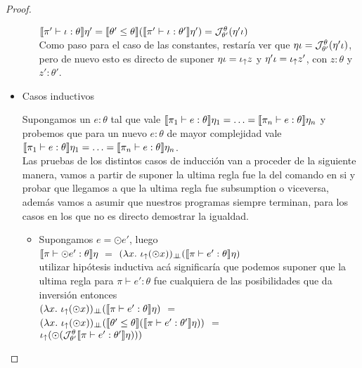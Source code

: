 \begin{proof}
\begin{itemize}
\begin{itemize}
$\llbracket \pi' \vdash \iota : \theta \rrbracket\eta' = 
\llbracket \theta' \leq \theta \rrbracket (\llbracket \pi' \vdash \iota : \theta' \rrbracket\eta') = 
\mathcal{J}_{\theta'}^{\theta} (\eta' \iota)$\\

Como paso para el caso de las constantes, restar\'ia ver que 
$\eta \iota = \mathcal{J}_{\theta'}^{\theta} (\eta' \iota)$, pero de nuevo esto es directo
de suponer $\eta \iota = \iota_{\uparrow} z$ y $\eta' \iota = \iota_{\uparrow} z'$, con
$z:\theta$ y $z':\theta'$.

\end{itemize}

\item Casos inductivos

Supongamos un $e : \theta$ tal que vale
$\llbracket \pi_1 \vdash e : \theta \rrbracket\eta_1 = \ldots = \llbracket \pi_n \vdash e : \theta \rrbracket\eta_n$ 
y probemos
que para un nuevo $e : \theta$ de mayor complejidad vale\\
$\llbracket \pi_1 \vdash e : \theta \rrbracket\eta_1 = \ldots = 
\llbracket \pi_n \vdash e : \theta \rrbracket\eta_n$. \\

Las pruebas de los distintos casos de inducci\'on van a proceder de la siguiente manera,
vamos a partir de suponer la ultima regla fue la del comando en si y probar que llegamos
a que la ultima regla fue subsumption o viceversa, adem\'as vamos a asumir que nuestros
programas siempre terminan, para los casos en los que no es directo demostrar la igualdad.

\begin{itemize}
\item Supongamos $e = \odot e'$, luego\\

$\llbracket \pi \vdash \odot e' : \theta \rrbracket\eta$ $=$ 
$(\lambda x . \ \iota_{\uparrow} (\odot x))_{\bot \!\!\! \bot} (\llbracket \pi \vdash e' : \theta \rrbracket\eta)$\\

utilizar hip\'otesis inductiva ac\'a significar\'ia que podemos suponer que la
ultima regla para $\pi \vdash e' : \theta$ fue cualquiera de las posibilidades que
da inversi\'on entonces\\

$(\lambda x . \ \iota_{\uparrow} (\odot x))_{\bot \!\!\! \bot} (\llbracket \pi \vdash e' : \theta \rrbracket\eta)$ $=$ \\
$(\lambda x . \ \iota_{\uparrow} (\odot x))_{\bot \!\!\! \bot} 
	(\llbracket \theta' \leq \theta \rrbracket(\llbracket \pi \vdash e' : \theta' \rrbracket\eta))$ $=$ \\
$\iota_{\uparrow} (\odot (\mathcal{J}_{\theta'}^{\theta} \llbracket \pi \vdash e' : \theta' \rrbracket\eta)))$\\


\end{itemize}
\end{itemize}
\end{proof}
